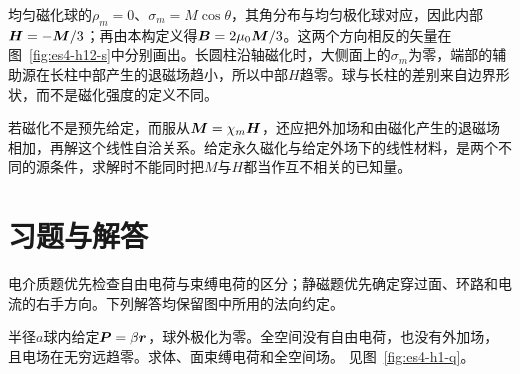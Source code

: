 均匀磁化球的$\rho_m=0$、$\sigma_m=M\cos\theta$，其角分布与均匀极化球对应，因此内部$\bm{H}=-\bm{M}/3$；再由本构定义得$\bm{B}=2\mu_0\bm{M}/3$。这两个方向相反的矢量在图~\ref{fig:es4-h12-s}中分别画出。长圆柱沿轴磁化时，大侧面上的$\sigma_m$为零，端部的辅助源在长柱中部产生的退磁场趋小，所以中部$H$趋零。球与长柱的差别来自边界形状，而不是磁化强度的定义不同。

若磁化不是预先给定，而服从$\bm{M}=\chi_m\bm{H}$，还应把外加场和由磁化产生的退磁场相加，再解这个线性自洽关系。给定永久磁化与给定外场下的线性材料，是两个不同的源条件，求解时不能同时把$M$与$H$都当作互不相关的已知量。




\section{习题与解答}
电介质题优先检查自由电荷与束缚电荷的区分；静磁题优先确定穿过面、环路和电流的右手方向。下列解答均保留图中所用的法向约定。

\begin{exercise}[非均匀极化球的体面电荷]\label{ex:es4-h1}
半径$a$球内给定$\bm{P}=\beta\bm{r}$，球外极化为零。全空间没有自由电荷，也没有外加场，且电场在无穷远趋零。求体、面束缚电荷和全空间场。 见图~\ref{fig:es4-h1-q}。
\end{exercise}

